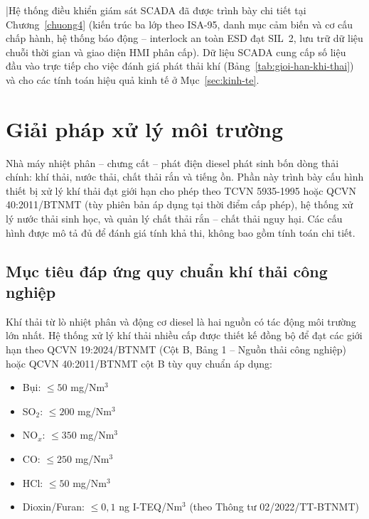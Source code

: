\documentclass[../main.tex]{subfiles}
\begin{document}
|Hệ thống điều khiển giám sát SCADA đã được trình bày chi tiết tại Chương~\ref{chuong4} (kiến trúc ba lớp theo ISA-95, danh mục cảm biến và cơ cấu chấp hành, hệ thống báo động -- interlock an toàn ESD đạt SIL~2, lưu trữ dữ liệu chuỗi thời gian và giao diện HMI phân cấp). Dữ liệu SCADA cung cấp số liệu đầu vào trực tiếp cho việc đánh giá phát thải khí (Bảng~\ref{tab:gioi-han-khi-thai}) và cho các tính toán hiệu quả kinh tế ở Mục~\ref{sec:kinh-te}.

\section{Giải pháp xử lý môi trường}
\label{sec:giai-phap-moi-truong}

Nhà máy nhiệt phân -- chưng cất -- phát điện diesel phát sinh bốn dòng thải chính: khí thải, nước thải, chất thải rắn và tiếng ồn. Phần này trình bày cấu hình thiết bị xử lý khí thải đạt giới hạn cho phép theo TCVN 5935-1995 hoặc QCVN 40:2011/BTNMT \cite{QCVN40_2025_BTNMT} (tùy phiên bản áp dụng tại thời điểm cấp phép), hệ thống xử lý nước thải sinh học, và quản lý chất thải rắn -- chất thải nguy hại. Các cấu hình được mô tả đủ để đánh giá tính khả thi, không bao gồm tính toán chi tiết.

\subsection{Mục tiêu đáp ứng quy chuẩn khí thải công nghiệp}

Khí thải từ lò nhiệt phân và động cơ diesel là hai nguồn có tác động môi trường lớn nhất. Hệ thống xử lý khí thải nhiều cấp được thiết kế đồng bộ để đạt các giới hạn theo QCVN 19:2024/BTNMT (Cột B, Bảng 1 -- Nguồn thải công nghiệp) hoặc QCVN 40:2011/BTNMT cột B tùy quy chuẩn áp dụng:

\begin{itemize}
  \item Bụi: $\leq 50$ mg/Nm$^3$
  \item SO$_2$: $\leq 200$ mg/Nm$^3$
  \item NO$_x$: $\leq 350$ mg/Nm$^3$
  \item CO: $\leq 250$ mg/Nm$^3$
  \item HCl: $\leq 50$ mg/Nm$^3$
  \item Dioxin/Furan: $\leq 0{,}1$ ng I-TEQ/Nm$^3$ (theo Thông tư 02/2022/TT-BTNMT)
\end{itemize}
\end{document}

